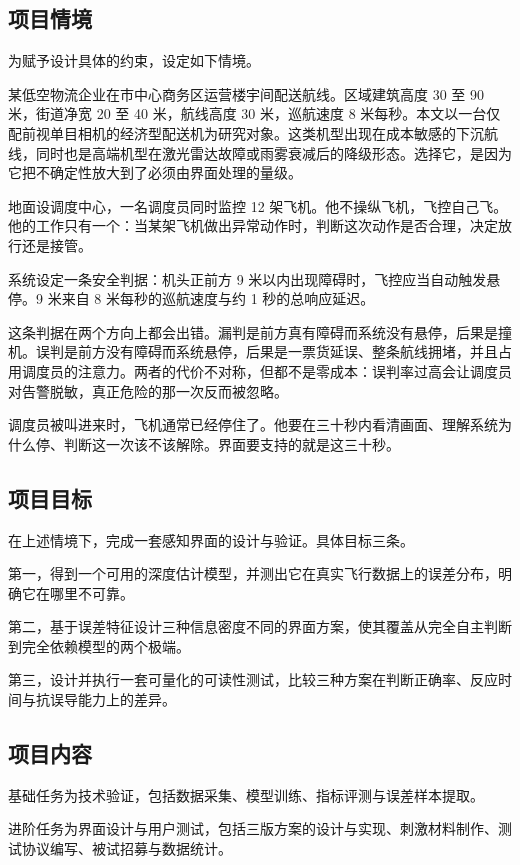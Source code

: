 \documentclass[12pt,a4paper]{ctexart}
\begin{document}
\subsection{项目情境}

为赋予设计具体的约束，设定如下情境。

某低空物流企业在市中心商务区运营楼宇间配送航线。区域建筑高度 30 至 90 米，街道净宽 20 至 40 米，航线高度 30 米，巡航速度 8 米每秒。本文以一台仅配前视单目相机的经济型配送机为研究对象。这类机型出现在成本敏感的下沉航线，同时也是高端机型在激光雷达故障或雨雾衰减后的降级形态。选择它，是因为它把不确定性放大到了必须由界面处理的量级。

地面设调度中心，一名调度员同时监控 12 架飞机。他不操纵飞机，飞控自己飞。他的工作只有一个：当某架飞机做出异常动作时，判断这次动作是否合理，决定放行还是接管。

系统设定一条安全判据：机头正前方 9 米以内出现障碍时，飞控应当自动触发悬停。9 米来自 8 米每秒的巡航速度与约 1 秒的总响应延迟。

这条判据在两个方向上都会出错。漏判是前方真有障碍而系统没有悬停，后果是撞机。误判是前方没有障碍而系统悬停，后果是一票货延误、整条航线拥堵，并且占用调度员的注意力。两者的代价不对称，但都不是零成本：误判率过高会让调度员对告警脱敏，真正危险的那一次反而被忽略。

调度员被叫进来时，飞机通常已经停住了。他要在三十秒内看清画面、理解系统为什么停、判断这一次该不该解除。界面要支持的就是这三十秒。

\subsection{项目目标}

在上述情境下，完成一套感知界面的设计与验证。具体目标三条。

第一，得到一个可用的深度估计模型，并测出它在真实飞行数据上的误差分布，明确它在哪里不可靠。

第二，基于误差特征设计三种信息密度不同的界面方案，使其覆盖从完全自主判断到完全依赖模型的两个极端。

第三，设计并执行一套可量化的可读性测试，比较三种方案在判断正确率、反应时间与抗误导能力上的差异。

\subsection{项目内容}

基础任务为技术验证，包括数据采集、模型训练、指标评测与误差样本提取。

进阶任务为界面设计与用户测试，包括三版方案的设计与实现、刺激材料制作、测试协议编写、被试招募与数据统计。
\end{document}

